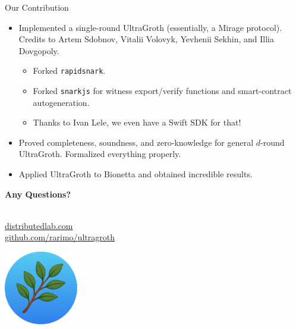 \documentclass{zkdl-presentation-template}
\begin{document}
\begin{frame}{Our Contribution}
    \begin{itemize}
        \item Implemented a single-round UltraGroth (essentially, a Mirage
        protocol). Credits to Artem Sdobnov, Vitalii Volovyk, Yevhenii 
        Sekhin, and Illia Dovgopoly.\pause
        \begin{itemize}
            \item Forked \texttt{rapidsnark}.\pause
            \item Forked \texttt{snarkjs} for witness export/verify functions
            and smart-contract autogeneration.\pause
            \item Thanks to Ivan Lele, we even have a Swift SDK for that!\pause
        \end{itemize}
        \item Proved completeness, soundness, and zero-knowledge for general
        $d$-round UltraGroth. Formalized everything properly.\pause
        \item Applied UltraGroth to Bionetta and obtained incredible results.
    \end{itemize}
\end{frame}

    \begin{frame}[plain]
        \centering
        \LARGE
        \textbf{Any Questions?} \\
        
        \vspace{0.2cm} \Huge {} \large \\
        
        \vspace{1cm}
  
        \href{https://distributedlab.com/}{\hspace{.325em}distributedlab.com} \\
  
        \href{https://github.com/rarimo/ultragroth}{\hspace{.325em}github.com/rarimo/ultragroth}
        
        \begin{center}
            \includegraphics[width=0.25\textwidth]{logo.png}
        \end{center}
    \end{frame}
\end{document}
